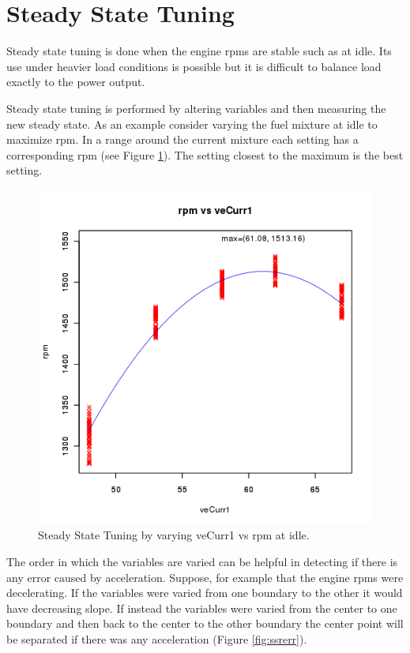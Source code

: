 \documentclass{article}
\begin{document}
\section{Steady State Tuning}
\label{sec:steadytun}

Steady state tuning is done when the engine rpms are stable such as
at idle.
Its use under heavier load conditions is possible but it is difficult to
balance load exactly to the power output.

Steady state tuning is performed by altering variables and then measuring
the new steady state.
As an example consider varying the fuel mixture at idle to maximize rpm.
In a range around the current mixture each setting has a corresponding
rpm (see Figure \ref{fig:sstrpm}).
The setting closest to the maximum is the best setting.

\begin{figure}[tbp]
\center
\includegraphics[scale=0.5]{plot01}
\caption{Steady State Tuning by varying veCurr1 vs rpm at idle.}
\label{fig:sstrpm}
\end{figure}

The order in which the variables are varied can be helpful in detecting
if there is any error caused by acceleration.
Suppose, for example that the engine rpms were decelerating.
If the variables were varied from one boundary to the other it would have
decreasing slope.
If instead the variables were varied from the center to one boundary and then
back to the center to the other boundary the center point will be
separated if there was any acceleration (Figure \ref{fig:ssrerr}).
\end{document}
